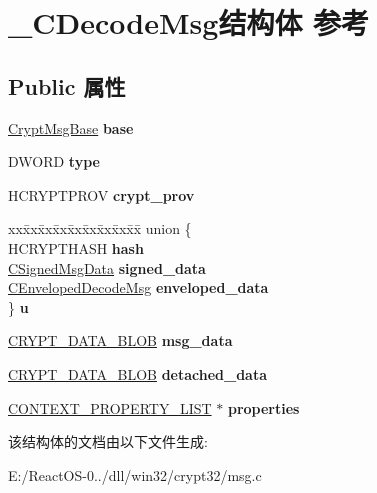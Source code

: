 \hypertarget{struct___c_decode_msg}{}\section{\+\_\+\+C\+Decode\+Msg结构体 参考}
\label{struct___c_decode_msg}
\subsection*{Public 属性}
\begin{DoxyCompactItemize}
\item 
\mbox{\label{struct___c_decode_msg_aaeafd8bd45da1ac42533ea4be055a05f}} 
\hyperlink{struct___crypt_msg_base}{Crypt\+Msg\+Base} {\bfseries base}
\item 
\mbox{\label{struct___c_decode_msg_a385f6e063e761d813b1f4c1b81b9e6f4}} 
D\+W\+O\+RD {\bfseries type}
\item 
\mbox{\label{struct___c_decode_msg_a45e079a13d5e77a6299d2e5f6b2a51f1}} 
H\+C\+R\+Y\+P\+T\+P\+R\+OV {\bfseries crypt\+\_\+prov}
\item 
\mbox{\label{struct___c_decode_msg_adc1b623832e74e47f68071808bdddfb7}} 
\begin{tabbing}
xx\=xx\=xx\=xx\=xx\=xx\=xx\=xx\=xx\=\kill
union \{\\
\>HCRYPTHASH {\bfseries hash}\\
\>\hyperlink{struct___c_signed_msg_data}{CSignedMsgData} {\bfseries signed\_data}\\
\>\hyperlink{struct___c_enveloped_decode_msg}{CEnvelopedDecodeMsg} {\bfseries enveloped\_data}\\
\} {\bfseries u}\\

\end{tabbing}\item 
\mbox{\label{struct___c_decode_msg_afa3ef8a2a8254cd862de844a688ea339}} 
\hyperlink{struct___c_r_y_p_t_o_a_p_i___b_l_o_b}{C\+R\+Y\+P\+T\+\_\+\+D\+A\+T\+A\+\_\+\+B\+L\+OB} {\bfseries msg\+\_\+data}
\item 
\mbox{\label{struct___c_decode_msg_a2a2266697b70f0aa6ce31bf760528d5a}} 
\hyperlink{struct___c_r_y_p_t_o_a_p_i___b_l_o_b}{C\+R\+Y\+P\+T\+\_\+\+D\+A\+T\+A\+\_\+\+B\+L\+OB} {\bfseries detached\+\_\+data}
\item 
\mbox{\label{struct___c_decode_msg_ae4f171ce0c2be937cbdc394922c272ff}} 
\hyperlink{struct___c_o_n_t_e_x_t___p_r_o_p_e_r_t_y___l_i_s_t}{C\+O\+N\+T\+E\+X\+T\+\_\+\+P\+R\+O\+P\+E\+R\+T\+Y\+\_\+\+L\+I\+ST} $\ast$ {\bfseries properties}
\end{DoxyCompactItemize}


该结构体的文档由以下文件生成\+:\begin{DoxyCompactItemize}
\item 
E\+:/\+React\+O\+S-\/0../dll/win32/crypt32/msg.\+c\end{DoxyCompactItemize}
